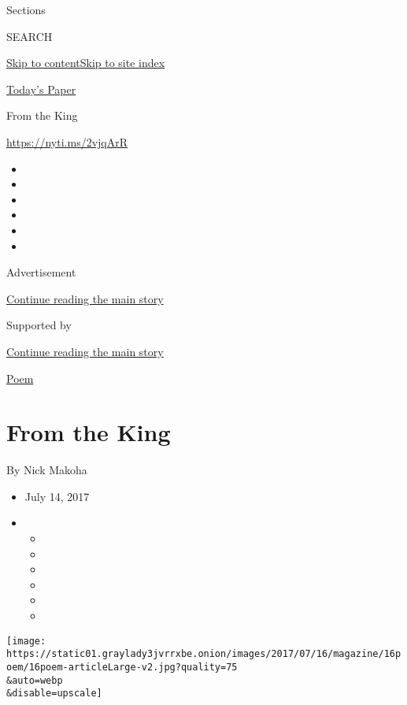 Sections

SEARCH

\protect\hyperlink{site-content}{Skip to
content}\protect\hyperlink{site-index}{Skip to site index}

\href{https://myaccount.nytimes3xbfgragh.onion/auth/login?response_type=cookie\&client_id=vi}{}

\href{https://www.nytimes3xbfgragh.onion/section/todayspaper}{Today's
Paper}

From the King

\url{https://nyti.ms/2vjqArR}

\begin{itemize}
\item
\item
\item
\item
\item
\item
\end{itemize}

Advertisement

\protect\hyperlink{after-top}{Continue reading the main story}

Supported by

\protect\hyperlink{after-sponsor}{Continue reading the main story}

\href{/column/magazine-poem}{Poem}

\hypertarget{from-the-king}{%
\section{From the King}\label{from-the-king}}

By Nick Makoha

\begin{itemize}
\item
  July 14, 2017
\item
  \begin{itemize}
  \item
  \item
  \item
  \item
  \item
  \item
  \end{itemize}
\end{itemize}

\texttt{[image: https://static01.graylady3jvrrxbe.onion/images/2017/07/16/magazine/16poem/16poem-articleLarge-v2.jpg?quality=75\\\&auto=webp\\\&disable=upscale]}

